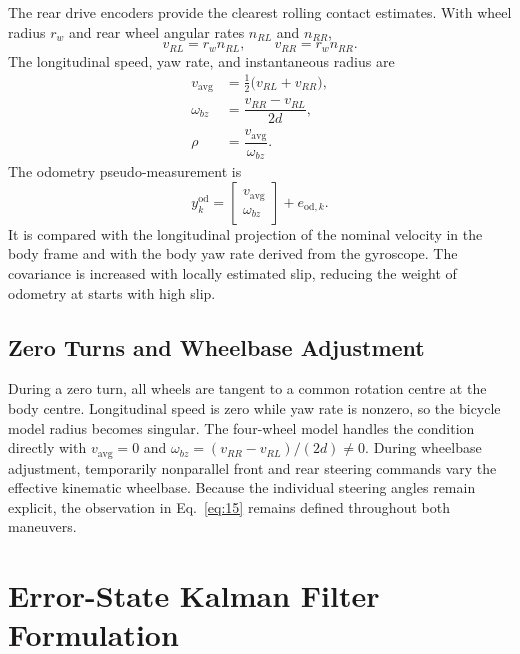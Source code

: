 \documentclass[]{IAC_style}
\begin{document}
The rear drive encoders provide the clearest rolling contact estimates. With wheel radius $r_w$ and rear wheel angular rates $n_{RL}$ and $n_{RR}$,
\begin{equation}
\tag{13}\label{eq:13}
v_{RL}=r_wn_{RL},\qquad v_{RR}=r_wn_{RR}.
\end{equation}
The longitudinal speed, yaw rate, and instantaneous radius are
\begin{equation}
\tag{14}\label{eq:14}
\begin{aligned}
v_{\mathrm{avg}}&=\tfrac12\bigl(v_{RL}+v_{RR}\bigr),\\
\omega_{bz}&=\dfrac{v_{RR}-v_{RL}}{2d},\\
\rho&=\dfrac{v_{\mathrm{avg}}}{\omega_{bz}}.
\end{aligned}
\end{equation}
The odometry pseudo-measurement is
\begin{equation}
\tag{15}\label{eq:15}
y_k^{\mathrm{od}}=\begin{bmatrix}v_{\mathrm{avg}}\\\omega_{bz}\end{bmatrix}+e_{\mathrm{od},k}.
\end{equation}
It is compared with the longitudinal projection of the nominal velocity in the body frame and with the body yaw rate derived from the gyroscope. The covariance is increased with locally estimated slip, reducing the weight of odometry at starts with high slip.

\subsection{Zero Turns and Wheelbase Adjustment}

During a zero turn, all wheels are tangent to a common rotation centre at the body centre. Longitudinal speed is zero while yaw rate is nonzero, so the bicycle model radius becomes singular. The four-wheel model handles the condition directly with $v_{\mathrm{avg}}=0$ and $\omega_{bz}=(v_{RR}-v_{RL})/(2d)\neq0$. During wheelbase adjustment, temporarily nonparallel front and rear steering commands vary the effective kinematic wheelbase. Because the individual steering angles remain explicit, the observation in Eq.~\eqref{eq:15} remains defined throughout both maneuvers.

\section{Error-State Kalman Filter Formulation}
\end{document}
